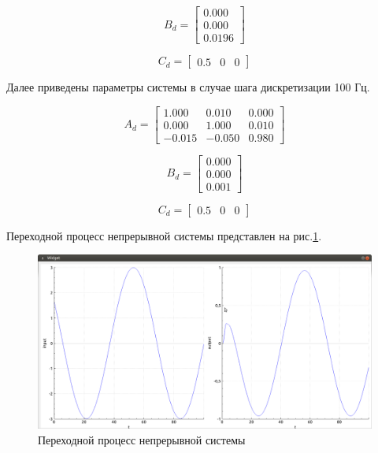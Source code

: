\documentclass[14pt,a4paper]{extreport}
\begin{document}
\begin{equation}
    B_{d} = 
    \begin{bmatrix} 
        0.000 \\ 
        0.000 \\
        0.0196
    \end{bmatrix}
\end{equation}

\begin{equation}
    C_{d} = 
    \begin{bmatrix} 
        0.5 & 0 & 0
    \end{bmatrix}
\end{equation}

Далее приведены параметры системы в случае шага дискретизации 100 Гц.

\begin{equation}
    A_{d} = 
    \begin{bmatrix} 
        1.000 & 0.010 & 0.000 \\ 
        0.000 & 1.000 & 0.010 \\
        -0.015 & -0.050 & 0.980
    \end{bmatrix}
\end{equation}

\begin{equation}
    B_{d} = 
    \begin{bmatrix} 
        0.000 \\ 
        0.000 \\
        0.001
    \end{bmatrix}
\end{equation}

\begin{equation}
    C_{d} = 
    \begin{bmatrix} 
        0.5 & 0 & 0
    \end{bmatrix}
\end{equation}

Переходной процесс непрерывной системы 
представлен на рис.\ref{fig:contin}.
\begin{figure}[H]
    \centering
    \includegraphics[width=160mm]{img/cont.png}
    \caption{Переходной процесс непрерывной системы}
    \label{fig:contin}
\end{figure}
\end{document}
